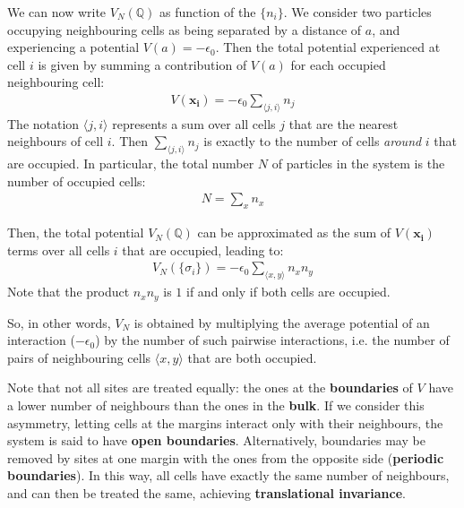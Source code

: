 \documentclass[../../main.tex]{subfiles}
\begin{document}
We can now write $V_N(\mathbb{Q})$ as function of the $\{n_i\}$. We consider two particles occupying neighbouring cells as being separated by a distance of $a$, and experiencing a potential $V(a) = -\epsilon_0$. Then the total potential experienced at cell $i$ is given by summing a contribution of $V(a)$ for each occupied neighbouring cell:
\begin{align*}
    V(\bm{x_i}) = - \epsilon_0\sum_{\langle j,i \rangle} n_j
\end{align*}
The notation $\langle j,i \rangle$ represents a sum over all cells $j$ that are the nearest neighbours of cell $i$. Then $\sum_{\langle j,i \rangle} n_j$ is exactly to the number of cells \textit{around} $i$ that are occupied. In particular, the total number $N$ of particles in the system is the number of occupied cells:
\begin{align}\label{eqn:num-particles1}
    N = \sum_x n_x
\end{align}

\medskip

Then, the total potential $V_N(\mathbb{Q})$ can be approximated as the sum of $V(\bm{x_i})$ terms over all cells $i$ that are occupied, leading to:
\begin{align}\label{eqn:total-pot1}
    V_N(\{\sigma_i\}) = - \epsilon_0 \sum_{\langle x,y \rangle} n_x n_y
\end{align}
Note that the product $n_x n_y$ is $1$ if and only if both cells are occupied.

So, in other words, $V_N$ is obtained by multiplying the average potential of an interaction ($-\epsilon_0$) by the number of such pairwise interactions, i.e. the number of pairs of neighbouring cells $\langle x,y\rangle$ that are both occupied.

\medskip

Note that not all sites are treated equally: the ones at the \textbf{boundaries} of $V$ have a lower number of neighbours than the ones in the \textbf{bulk}. If we consider this asymmetry, letting cells at the margins interact only with their neighbours, the system is said to have \textbf{open boundaries}. Alternatively, boundaries may be removed by  sites at one margin with the ones from the opposite side (\textbf{periodic boundaries}). In this way, all cells have exactly the same number of neighbours, and can then be treated the same, achieving \textbf{translational invariance}.

\medskip
\end{document}
